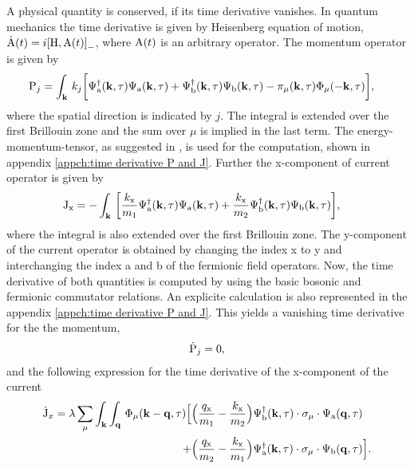 A physical quantity is conserved, if its time derivative vanishes.
In quantum mechanics the time derivative is given by Heisenberg equation of motion, $\dot{\mt{A}}(t) = i\comm{\mt{H}}{\mt{A}(t)}_{-}$, where $\mathrm{A}(t)$ is an arbitrary operator.
The momentum operator is given by 
%
\begin{align}
	\mathrm{P}_{j} &= \int_{\vb{k}}\, 
		k_{j}\bigg[
	 		\Psi_{\mathrm{a}}^{\dag}(\vb{k},\tau) \Psi_{\mathrm{a}}(\vb{k},\tau)
	 		+
	 		\Psi_{\mathrm{b}}^{\dag}(\vb{k},\tau) \Psi_{\mathrm{b}}(\vb{k},\tau)
	 		-
	 		\pi_{\mu}(\vb{k},\tau) \Phi_{\mu}(-\vb{k},\tau)
		\bigg],
		\label{eq:momentum operator}
\end{align}
%
where the spatial direction is indicated by $j$.
The integral is extended over the first Brillouin zone and the sum over $\mu$ is implied in the last term.
The energy-momentum-tensor, as suggested in \cite{Iliev}, is used for the computation, shown in appendix \ref{appch:time derivative P and J}.
Further the x-component of current operator is given by
%
\begin{align}
	\mathrm{J}_{\mathrm{x}} &= - \int_{\vb{k}}\, \bigg[
		\frac{k_{\mathrm{x}}}{m_{1}} \Psi_{\mathrm{a}}^{\dag}(\vb{k},\tau) \Psi_{\mathrm{a}}(\vb{k},\tau)
		+ 
		\frac{k_{\mathrm{x}}}{m_{2}} \Psi_{\mathrm{b}}^{\dag}(\vb{k},\tau) \Psi_{\mathrm{b}}(\vb{k},\tau)
	\bigg],
	\label{eq:current operator}
\end{align}
%
where the integral is also extended over the first Brillouin zone.
The y-component of the current operator is obtained by changing the index x to y and interchanging the index a and b of the fermionic field operators.
Now, the time derivative of both quantities is computed by using the basic bosonic and fermionic commutator relations.
An explicite calculation is also represented in the appendix \ref{appch:time derivative P and J}.
This yields a vanishing time derivative for the the momentum,
%
\begin{align}
	\dot{\mathrm{P}}_{j} = 0,
	\label{eq:time derivative momentum}
\end{align}
%
and the following expression for the time derivative of the x-component of the current
%
\begin{align}
	\dot{\mathrm{J}}_{x} = \lambda
		\sum\limits_{\mu} \int_{\vb{k}} \int_{\vb{q}}\,
		\Phi_{\mu}(\vb{k}-\vb{q},\tau)
		\Big[
			&\Big(\frac{q_{\mathrm{x}}}{m_{1}} - \frac{k_{\mathrm{x}}}{m_{2}}\Big)
			\Psi_{\mathrm{b}}^{\dag}(\vb{k},\tau) \cdot \sigma_{\mu} \cdot \Psi_{\mathrm{a}}(\vb{q},\tau)
			\notag \\+
			&\Big(\frac{q_{\mathrm{x}}}{m_{2}} - \frac{k_{\mathrm{x}}}{m_{1}}\Big)
			\Psi_{\mathrm{a}}^{\dag}(\vb{k},\tau) \cdot \sigma_{\mu} \cdot \Psi_{\mathrm{b}}(\vb{q},\tau)
		\Big].
		\label{eq:time derivative current}
\end{align}
